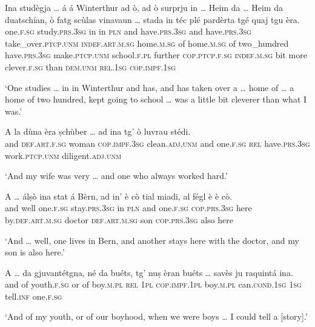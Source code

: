 \begin{linenumbers}
\gll    Ina studègja … á á Winterthur ad ò, ad ò surprju in … Heim\footnotemark{} da … Heim da duatschían, ò fatg scùlas vinavaun … stada in téc plé pardèrta tgé quaj tgu èra.\\
one.\textsc{f.sg} study.\textsc{prs.3sg} {} in in \textsc{pln} and have.\textsc{prs.3sg} and  have.\textsc{prs.3sg} take\_over.\textsc{ptcp.unm} \textsc{indef.art.m.sg} {} home.\textsc{m.sg} of {}  home.\textsc{m.sg} of two\_hundred have.\textsc{prs.3sg} make.\textsc{ptcp.unm} school.\textsc{f.pl} further {} \textsc{cop.ptcp.f.sg} \textsc{indef.m.sg} bit more  clever.\textsc{f.sg} than \textsc{dem.unm} \textsc{rel.1sg} \textsc{cop.impf.1sg} \\
\end{linenumbers}
\medskip
\glt `One studies … in in Winterthur and has, and has taken over a … home of … a home of two hundred, kept going to school … was a little bit cleverer than what I was.'
\medskip

\begin{linenumbers}
\gll    A la dùna èra ṣchùber … ad ina tg’ ò luvrau stédi.\\
and \textsc{def.art.f.sg} woman \textsc{cop.impf.3sg} clean.\textsc{adj.unm} {} and one.\textsc{f.sg} \textsc{rel} have.\textsc{prs.3sg} work.\textsc{ptcp.unm} diligent.\textsc{adj.unm} \\
\end{linenumbers}
\medskip
\glt `And my wife was very … and one who always worked hard.'
\medskip

\begin{linenumbers}
\gll    A … álṣò ina stat á Bèrn, ad in’ è cò tial miadi, al fégl è è cò.\\
and {} well one.\textsc{f.sg} stay.\textsc{prs.3sg} in \textsc{pln} and one.\textsc{f.sg} \textsc{cop.prs.3sg} here by.\textsc{def.art.m.sg} doctor \textsc{def.art.m.sg} son \textsc{cop.prs.3sg} also here\\
\end{linenumbers}
\medskip
\glt `And … well, one lives in Bern, and another stays here with the doctor, and my son is also here.'
\medskip

\begin{linenumbers}
\gll A … da gjuvantétgna, né da buéts, tg’ nuṣ èran buéts … savès ju raquintá ina.\\
and {} of  youth.\textsc{f.sg} or of boy.\textsc{m.pl} \textsc{rel} \textsc{1pl} \textsc{cop.impf.1pl} boy.\textsc{m.pl} {} can.\textsc{cond.1sg} \textsc{1sg} tell.\textsc{inf} one.\textsc{f.sg}\\
\end{linenumbers}
\medskip
\glt `And of my youth, or of our boyhood, when we were boys … I could tell a [story].'
\medskip

